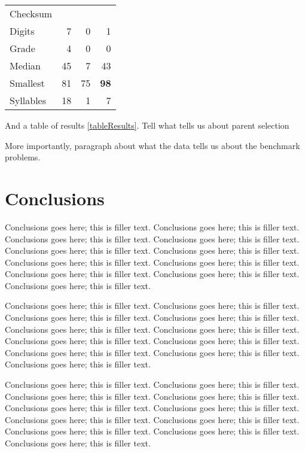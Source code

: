 \documentclass{sig-alternate}
\begin{document}
\begin{table}[t]
\begin{tabular}{|l|rrr|}
Checksum                   &          &         &     \\
Digits                     & 7        & 0       & 1   \\
Grade                      & 4        & 0       & 0   \\
Median                     & 45       & 7       & 43  \\
Smallest                   & 81       & 75      & \textbf{98}  \\
Syllables                  & 18       & 1       & 7   \\
\hline
\end{tabular}
\end{table}

And a table of results \ref{tableResults}. Tell what tells us about parent selection


More importantly, paragraph about what the data tells us about the benchmark problems.



\section{Conclusions}

Conclusions goes here; this is filler text. Conclusions goes here; this is filler text. Conclusions goes here; this is filler text. Conclusions goes here; this is filler text. Conclusions goes here; this is filler text. Conclusions goes here; this is filler text. Conclusions goes here; this is filler text. Conclusions goes here; this is filler text. Conclusions goes here; this is filler text. Conclusions goes here; this is filler text. Conclusions goes here; this is filler text. 

Conclusions goes here; this is filler text. Conclusions goes here; this is filler text. Conclusions goes here; this is filler text. Conclusions goes here; this is filler text. Conclusions goes here; this is filler text. Conclusions goes here; this is filler text. Conclusions goes here; this is filler text. Conclusions goes here; this is filler text. Conclusions goes here; this is filler text. Conclusions goes here; this is filler text. Conclusions goes here; this is filler text. 

Conclusions goes here; this is filler text. Conclusions goes here; this is filler text. Conclusions goes here; this is filler text. Conclusions goes here; this is filler text. Conclusions goes here; this is filler text. Conclusions goes here; this is filler text. Conclusions goes here; this is filler text. Conclusions goes here; this is filler text. Conclusions goes here; this is filler text. Conclusions goes here; this is filler text. Conclusions goes here; this is filler text. 
\end{document}
